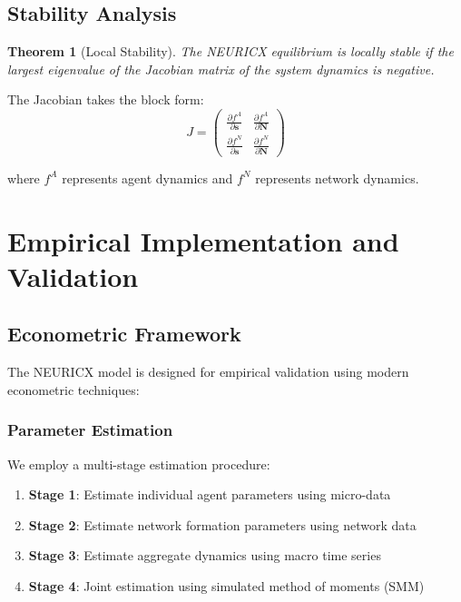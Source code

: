 \documentclass[12pt,a4paper]{article}
\newtheorem{theorem}{Theorem}[section]
\begin{document}
\subsection{Stability Analysis}

\begin{theorem}[Local Stability]
The NEURICX equilibrium is locally stable if the largest eigenvalue of the Jacobian matrix of the system dynamics is negative.
\end{theorem}

The Jacobian takes the block form:
\begin{equation}
J = \begin{pmatrix}
\frac{\partial f^A}{\partial \mathbf{s}} & \frac{\partial f^A}{\partial \mathbf{N}} \\
\frac{\partial f^N}{\partial \mathbf{s}} & \frac{\partial f^N}{\partial \mathbf{N}}
\end{pmatrix}
\end{equation}

where $f^A$ represents agent dynamics and $f^N$ represents network dynamics.

\section{Empirical Implementation and Validation}

\subsection{Econometric Framework}

The NEURICX model is designed for empirical validation using modern econometric techniques:

\subsubsection{Parameter Estimation}

We employ a multi-stage estimation procedure:

\begin{enumerate}
\item \textbf{Stage 1}: Estimate individual agent parameters using micro-data
\item \textbf{Stage 2}: Estimate network formation parameters using network data
\item \textbf{Stage 3}: Estimate aggregate dynamics using macro time series
\item \textbf{Stage 4}: Joint estimation using simulated method of moments (SMM)
\end{enumerate}
\end{document}
